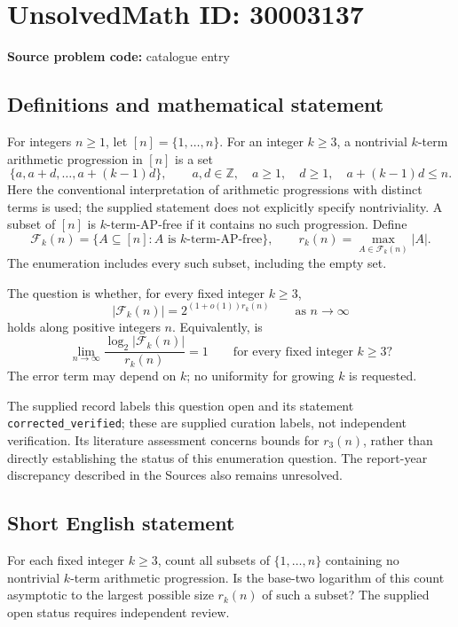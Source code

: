 \documentclass[11pt]{article}
\newcommand{\Z}{\mathbb{Z}}
\begin{document}
\section*{UnsolvedMath ID: 30003137}
\textbf{Source problem code:} catalogue entry
\subsection{Definitions and mathematical statement}
For integers \(n\geq 1\), let \([n]=\{1,\ldots,n\}\). For an integer \(k\geq 3\), a nontrivial \(k\)-term arithmetic progression in \([n]\) is a set
\[
\{a,a+d,\ldots,a+(k-1)d\},
\qquad a,d\in\Z,\quad a\geq1,\quad d\geq1,\quad a+(k-1)d\leq n.
\]
Here the conventional interpretation of arithmetic progressions with distinct terms is used; the supplied statement does not explicitly specify nontriviality. A subset of \([n]\) is \(k\)-term-AP-free if it contains no such progression. Define
\[
\mathcal F_k(n)=\{A\subseteq[n]:A\text{ is }k\text{-term-AP-free}\},
\qquad
r_k(n)=\max_{A\in\mathcal F_k(n)}|A|.
\]
The enumeration includes every such subset, including the empty set.

The question is whether, for every fixed integer \(k\geq3\),
\[
|\mathcal F_k(n)|=2^{(1+o(1))r_k(n)}
\qquad\text{as }n\to\infty
\]
holds along positive integers \(n\). Equivalently, is
\[
\lim_{n\to\infty}\frac{\log_2|\mathcal F_k(n)|}{r_k(n)}=1
\qquad\text{for every fixed integer }k\geq3?
\]
The error term may depend on \(k\); no uniformity for growing \(k\) is requested.

The supplied record labels this question open and its statement \texttt{corrected\_verified}; these are supplied curation labels, not independent verification. Its literature assessment concerns bounds for \(r_3(n)\), rather than directly establishing the status of this enumeration question. The report-year discrepancy described in the Sources also remains unresolved.
\subsection{Short English statement}
For each fixed integer \(k\geq3\), count all subsets of \(\{1,\ldots,n\}\) containing no nontrivial \(k\)-term arithmetic progression. Is the base-two logarithm of this count asymptotic to the largest possible size \(r_k(n)\) of such a subset? The supplied open status requires independent review.
\end{document}
